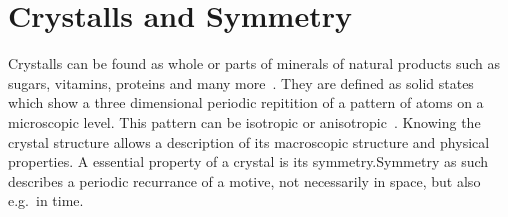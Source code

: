  
\section{Crystalls and Symmetry}\label{sec:Q4}

Crystalls can be found as whole or parts of minerals of natural products such as sugars, vitamins, proteins and many more~\cite{Bohm.2021}. They are defined as solid states which show a three dimensional periodic repitition of a pattern of atoms on a microscopic level. This pattern can be isotropic or anisotropic~\cite{Schwarzenbach.2001}. Knowing the crystal structure allows a description of its macroscopic structure and physical properties. A essential property of a crystal is its symmetry.Symmetry as such describes a periodic recurrance of a motive, not necessarily in space, but also e.g.~in time. 